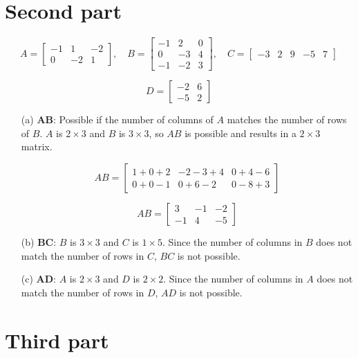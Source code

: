 \documentclass{article}
\begin{document}
\section*{Second part}
\[
A =
\begin{bmatrix}
-1 & 1 & -2 \\
0 & -2 & 1
\end{bmatrix},
\quad
B =
\begin{bmatrix}
-1 & 2 & 0 \\
0 & -3 & 4 \\
-1 & -2 & 3
\end{bmatrix},
\quad
C =
\begin{bmatrix}
-3 & 2 & 9 & -5 & 7
\end{bmatrix}
\]

\[
D =
\begin{bmatrix}
-2 & 6 \\
-5 & 2
\end{bmatrix}
\]


\begin{enumerate}
    \item[(a)] \textbf{AB}: Possible if the number of columns of \(A\) matches the number of rows of \(B\). \(A\) is \(2 \times 3\) and \(B\) is \(3 \times 3\), so \(AB\) is possible and results in a \(2 \times 3\) matrix.


    \[
    AB =
    \begin{bmatrix}
    1 + 0 + 2 & -2 - 3 + 4 & 0 + 4 - 6 \\
    0 + 0 - 1 & 0 + 6 - 2 & 0 - 8 + 3
    \end{bmatrix}
    \]

    \[
    AB =
    \begin{bmatrix}
    3 & -1 & -2 \\
    -1 & 4 & -5
    \end{bmatrix}
    \]
    \item[(b)] \textbf{BC}: \(B\) is \(3 \times 3\) and \(C\) is \(1 \times 5\). Since the number of columns in \(B\) does not match the number of rows in \(C\), \(BC\) is not possible.
    \item[(c)] \textbf{AD}: \(A\) is \(2 \times 3\) and \(D\) is \(2 \times 2\). Since the number of columns in \(A\) does not match the number of rows in \(D\), \(AD\) is not possible.
\end{enumerate}

\newpage
\section*{Third part}
\end{document}
